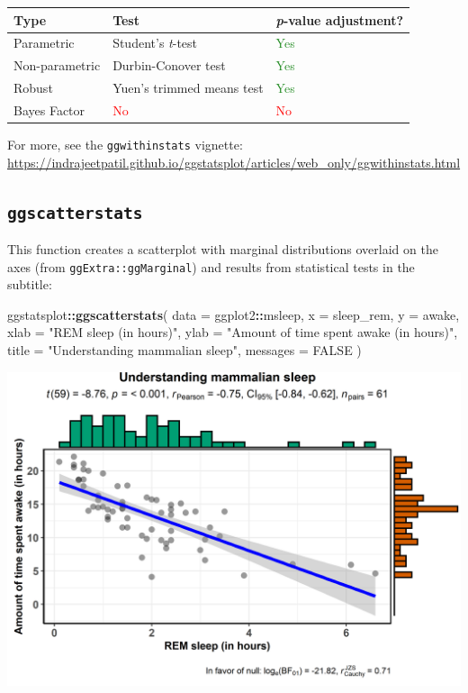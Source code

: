 \documentclass[]{article}
\newenvironment{Shaded}{\begin{snugshade}}{\end{snugshade}}
\newcommand{\DataTypeTok}[1]{\textcolor[rgb]{0.13,0.29,0.53}{#1}}
\newcommand{\KeywordTok}[1]{\textcolor[rgb]{0.13,0.29,0.53}{\textbf{#1}}}
\newcommand{\NormalTok}[1]{#1}
\newcommand{\OperatorTok}[1]{\textcolor[rgb]{0.81,0.36,0.00}{\textbf{#1}}}
\newcommand{\OtherTok}[1]{\textcolor[rgb]{0.56,0.35,0.01}{#1}}
\newcommand{\StringTok}[1]{\textcolor[rgb]{0.31,0.60,0.02}{#1}}
\begin{document}
\begin{longtable}[]{@{}lll@{}}
\toprule
Type & Test & \emph{p}-value adjustment?\tabularnewline
\midrule
\endhead
Parametric & Student's \emph{t}-test & \textcolor{ForestGreen}{Yes}\tabularnewline
Non-parametric & Durbin-Conover test & \textcolor{ForestGreen}{Yes}\tabularnewline
Robust & Yuen's trimmed means test & \textcolor{ForestGreen}{Yes}\tabularnewline
Bayes Factor & \textcolor{red}{No} & \textcolor{red}{No}\tabularnewline
\bottomrule
\end{longtable}

For more, see the \texttt{ggwithinstats} vignette:
\url{https://indrajeetpatil.github.io/ggstatsplot/articles/web_only/ggwithinstats.html}

\hypertarget{ggscatterstats}{%
\subsection{\texorpdfstring{\texttt{ggscatterstats}}{ggscatterstats}}\label{ggscatterstats}}

This function creates a scatterplot with marginal distributions overlaid on the
axes (from \texttt{ggExtra::ggMarginal}) and results from statistical tests in the
subtitle:

\begin{Shaded}
\begin{Highlighting}[]
\NormalTok{ggstatsplot}\OperatorTok{::}\KeywordTok{ggscatterstats}\NormalTok{(}
  \DataTypeTok{data =}\NormalTok{ ggplot2}\OperatorTok{::}\NormalTok{msleep,}
  \DataTypeTok{x =}\NormalTok{ sleep_rem,}
  \DataTypeTok{y =}\NormalTok{ awake,}
  \DataTypeTok{xlab =} \StringTok{"REM sleep (in hours)"}\NormalTok{,}
  \DataTypeTok{ylab =} \StringTok{"Amount of time spent awake (in hours)"}\NormalTok{,}
  \DataTypeTok{title =} \StringTok{"Understanding mammalian sleep"}\NormalTok{,}
  \DataTypeTok{messages =} \OtherTok{FALSE}
\NormalTok{)}
\end{Highlighting}
\end{Shaded}

\includegraphics[width=1\linewidth]{./figures/paper-ggscatterstats1-1}
\end{document}
